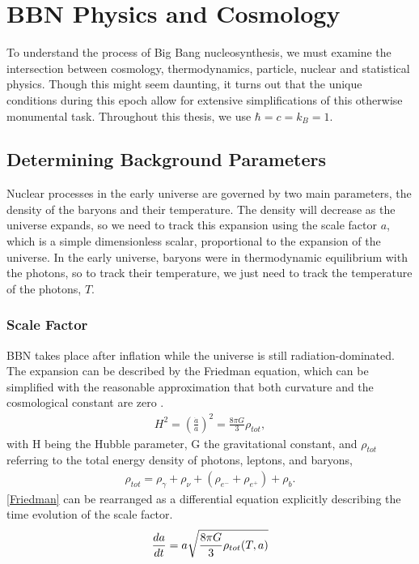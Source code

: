 
\chapter{BBN Physics and Cosmology}
\label{chap:theory}

To understand the process of Big Bang nucleosynthesis, we must examine the intersection between cosmology, thermodynamics, particle, nuclear and statistical physics. Though this might seem daunting, it turns out that the unique conditions during this epoch allow for extensive simplifications of this otherwise monumental task. Throughout this thesis, we use $\hbar=c=k_B=1$.



\section{Determining Background Parameters}
\label{sec:Background}
Nuclear processes in the early universe are governed by two main parameters, the density of the baryons and their temperature. The density will decrease as the universe expands, so we need to track this expansion using the scale factor $a$, which is a simple dimensionless scalar, proportional to the expansion of the universe. In the early universe, baryons were in thermodynamic equilibrium with the photons, so to track their temperature, we just need to track the temperature of the photons, $T$. 


\subsection{Scale Factor}
\label{ssec:cosmology}

BBN takes place after inflation while the universe is still radiation-dominated. The expansion can be described by the Friedman equation, which can be simplified with the reasonable approximation that both curvature and the cosmological constant are zero \cite[{(4.29)}]{Ryden}. 
\begin{align}
    H^2=\left(\frac{\dot{a}}{a}\right)^2=\frac{8\pi G}{3}\rho_{tot},
    \label{Friedman}
\end{align}
with H being the Hubble parameter, G the gravitational constant, and $\rho_{tot}$ referring to the total energy density of photons, leptons, and baryons,
\begin{align}
    \rho_{tot}=\rho_{\gamma}+\rho_{\nu}+(\rho_{e^-}+\rho_{e^+})+\rho_{b}.
\end{align}
\eqref{Friedman} can be rearranged as a differential equation explicitly describing the time evolution of the scale factor.
\begin{align}
    \frac{da}{dt}=a\sqrt{\frac{8\pi G}{3}\rho_{tot}(T,a)}
    \label{eq:dadt}
\end{align}

